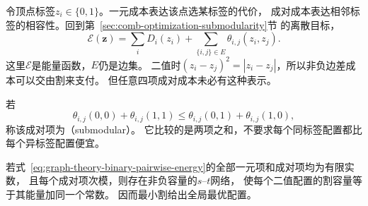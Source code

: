 令顶点标签\(z_i\in\{0,1\}\)。一元成本表达该点选某标签的代价，
成对成本表达相邻标签的相容性。回到第~\ref{sec:comb-optimization-submodularity}节
的离散目标，
\begin{equation}
  \mathcal E(\bm z)=\sum_iD_i(z_i)
  +\sum_{\{i,j\}\in E}\theta_{i,j}(z_i,z_j).
  \label{eq:graph-theory-binary-pairwise-energy}
\end{equation}
这里\(\mathcal E\)是能量函数，\(E\)仍是边集。
二值时\((z_i-z_j)^2=|z_i-z_j|\)，所以非负边差成本可以交由割来支付。
但任意四项成对成本未必有这种表示。

若
\begin{equation}
  \theta_{i,j}(0,0)+\theta_{i,j}(1,1)
  \leq\theta_{i,j}(0,1)+\theta_{i,j}(1,0),
  \label{eq:graph-theory-pairwise-submodularity}
\end{equation}
称该成对项为（submodular）。
它比较的是两项之和，不要求每个同标签配置都比每个异标签配置便宜。

\begin{theorem}[二值次模成对能量的割表示]
  \label{thm:graph-theory-submodular-cut-representation}
  若式~\eqref{eq:graph-theory-binary-pairwise-energy}的全部一元项和成对项均为有限实数，
  且每个成对项次模，则存在非负容量的\(s\)--\(t\)网络，
  使每个二值配置的割容量等于其能量加同一个常数。
  因而最小割给出全局最优配置。
\end{theorem}

